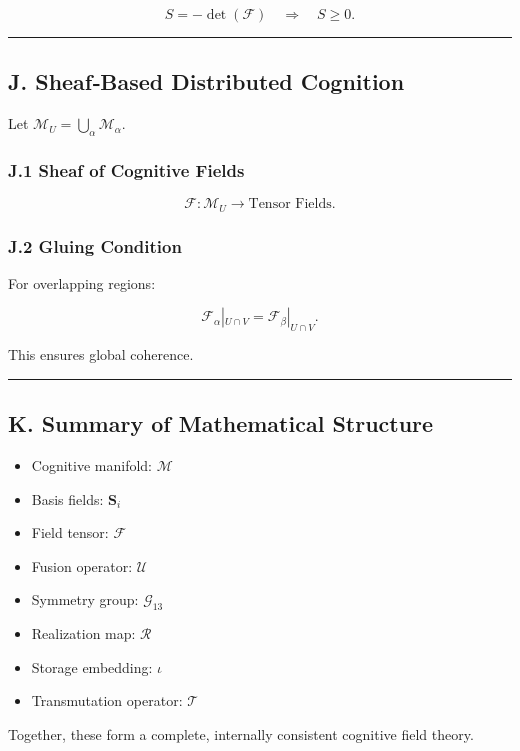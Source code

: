 \[
S = -\det(\mathcal{F}) \quad \Rightarrow \quad S \ge 0.
\]

\begin{center}\rule{0.5\linewidth}{0.5pt}\end{center}

\subsection{J. Sheaf‑Based Distributed Cognition}\label{j.-sheafbased-distributed-cognition}

Let \(\mathcal{M}_U = \bigcup_\alpha \mathcal{M}_\alpha\).

\subsubsection{J.1 Sheaf of Cognitive Fields}\label{j.1-sheaf-of-cognitive-fields}

\[
\mathscr{F} : \mathcal{M}_U \rightarrow \text{Tensor Fields}.
\]

\subsubsection{J.2 Gluing Condition}\label{j.2-gluing-condition}

For overlapping regions:

\[
\mathcal{F}_\alpha|_{U \cap V} = \mathcal{F}_\beta|_{U \cap V}.
\]

This ensures global coherence.

\begin{center}\rule{0.5\linewidth}{0.5pt}\end{center}

\subsection{K. Summary of Mathematical Structure}\label{k.-summary-of-mathematical-structure}

\begin{itemize}
\tightlist
\item
  Cognitive manifold: \(\mathcal{M}\)\\
\item
  Basis fields: \(\mathbf{S}_i\)\\
\item
  Field tensor: \(\mathcal{F}\)\\
\item
  Fusion operator: \(\mathcal{U}\)\\
\item
  Symmetry group: \(\mathcal{G}_{13}\)\\
\item
  Realization map: \(\mathcal{R}\)\\
\item
  Storage embedding: \(\iota\)\\
\item
  Transmutation operator: \(\mathcal{T}\)
\end{itemize}

Together, these form a complete, internally consistent cognitive field theory.
